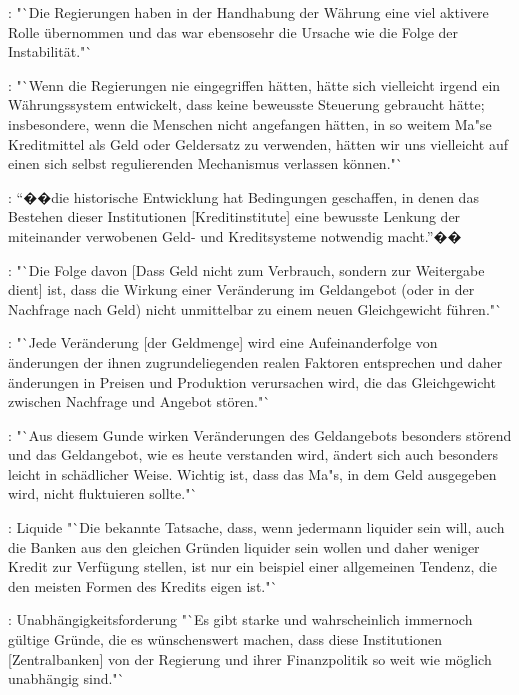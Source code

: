 \documentclass[
    onecolumn,
    a4paper,
    abstracton,
    parskip=half
    ,final
    ]{scrartcl}
\begin{document}
\citep[vgl.][S.409]{hayek1971die}: "`Die Regierungen haben in der Handhabung der W{\"a}hrung eine viel aktivere Rolle {\"u}bernommen und das war ebensosehr die Ursache wie die Folge der Instabilit{\"a}t."`

\citep[vgl.][S.409]{hayek1971die}: "`Wenn die Regierungen nie eingegriffen h{\"a}tten, h{\"a}tte sich vielleicht irgend ein W{\"a}hrungssystem entwickelt, dass keine beweusste Steuerung gebraucht h{\"a}tte; insbesondere, wenn die Menschen nicht angefangen h{\"a}tten, in so weitem Ma{"s}e Kreditmittel als Geld oder Geldersatz zu verwenden, h{\"a}tten wir uns vielleicht auf einen sich selbst regulierenden Mechanismus verlassen k{\"o}nnen."`

\citep[vgl.][S.410]{hayek1971die}: "`��die historische Entwicklung hat Bedingungen geschaffen, in denen das Bestehen dieser Institutionen [Kreditinstitute] eine bewusste Lenkung der miteinander verwobenen Geld- und Kreditsysteme notwendig macht."'��

\citep[vgl.][S.410]{hayek1971die}: "`Die Folge davon [Dass Geld nicht zum Verbrauch, sondern zur Weitergabe dient] ist, dass die Wirkung einer Ver{\"a}nderung im Geldangebot (oder in der Nachfrage nach Geld) nicht unmittelbar zu einem neuen Gleichgewicht f{\"u}hren."`

\citep[vgl.][S.411]{hayek1971die}: "`Jede Ver{\"a}nderung [der Geldmenge] wird eine Aufeinanderfolge von {\"a}nderungen der ihnen zugrundeliegenden realen Faktoren entsprechen und daher {\"a}nderungen in Preisen und Produktion verursachen wird, die das Gleichgewicht zwischen Nachfrage und Angebot st{\"o}ren."`

\citep[vgl.][S.411]{hayek1971die}: "`Aus diesem Gunde wirken Ver{\"a}nderungen des Geldangebots besonders st{\"o}rend und das Geldangebot, wie es heute verstanden wird, {\"a}ndert sich auch besonders leicht in sch{\"a}dlicher Weise. Wichtig ist, dass das Ma{"s}, in dem Geld ausgegeben wird, nicht fluktuieren sollte."`

\citep[vgl.][S.412]{hayek1971die}: Liquide "`Die bekannte Tatsache, dass, wenn jedermann liquider sein will, auch die Banken aus den gleichen Gr{\"u}nden liquider sein wollen und daher weniger Kredit zur Verf{\"u}gung stellen, ist nur ein beispiel einer allgemeinen Tendenz, die den meisten Formen des Kredits eigen ist."`

\citep[vgl.][S.412]{hayek1971die}: Unabh{\"a}ngigkeitsforderung "`Es gibt starke und wahrscheinlich immernoch g{\"u}ltige Gr{\"u}nde, die es w{\"u}nschenswert machen, dass diese Institutionen [Zentralbanken] von der Regierung und ihrer Finanzpolitik so weit wie m{\"o}glich unabh{\"a}ngig sind."`
\end{document}
